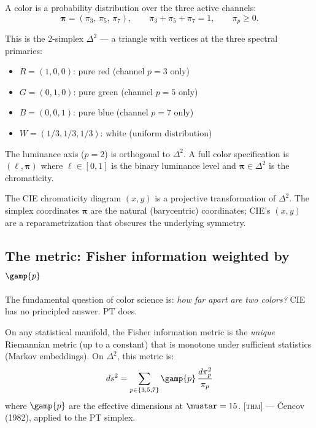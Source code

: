\documentclass[12pt,a4paper]{article}
\begin{document}
A color is a probability distribution over the three active channels:
\begin{equation}
  \bm{\pi} = (\pi_3,\, \pi_5,\, \pi_7), \qquad
  \pi_3 + \pi_5 + \pi_7 = 1, \qquad \pi_p \geq 0.
  \label{eq:simplex}
\end{equation}

This is the 2-simplex $\Delta^2$ --- a triangle with vertices at the
three spectral primaries:
\begin{itemize}[nosep]
\item $R = (1,0,0)$: pure red (channel $p=3$ only)
\item $G = (0,1,0)$: pure green (channel $p=5$ only)
\item $B = (0,0,1)$: pure blue (channel $p=7$ only)
\item $W = (1/3, 1/3, 1/3)$: white (uniform distribution)
\end{itemize}

The luminance axis ($p = 2$) is orthogonal to $\Delta^2$. A full color
specification is $(\ell, \bm{\pi})$ where $\ell \in [0,1]$ is the
binary luminance level and $\bm{\pi} \in \Delta^2$ is the chromaticity.

\begin{remark}
The CIE chromaticity diagram $(x,y)$ is a projective transformation of
$\Delta^2$. The simplex coordinates $\bm{\pi}$ are the natural
(barycentric) coordinates; CIE's $(x,y)$ are a reparametrization that
obscures the underlying symmetry.
\end{remark}

\subsection{The metric: Fisher information weighted by $\gamp{p}$}

The fundamental question of color science is: \emph{how far apart are
two colors?} CIE has no principled answer. PT does.

\begin{theorembox}
On any statistical manifold, the Fisher information metric is the
\emph{unique} Riemannian metric (up to a constant) that is monotone
under sufficient statistics (Markov embeddings). On $\Delta^2$, this
metric is:
\begin{equation}
  ds^2 = \sum_{p \in \{3,5,7\}} \gamp{p} \,
    \frac{d\pi_p^2}{\pi_p}
  \label{eq:fisher}
\end{equation}
where $\gamp{p}$ are the effective dimensions at $\mustar = 15$.
\textsc{[thm]} --- \v{C}encov (1982), applied to the PT simplex.
\end{theorembox}
\end{document}
